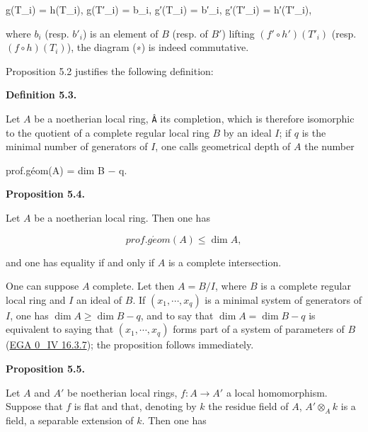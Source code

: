 \documentclass[
  11pt,
  a4paper,
]{book}
\newenvironment{Shaded}{}{}
\newcommand{\NormalTok}[1]{#1}
\begin{document}
\begin{Shaded}
\begin{Highlighting}[]
\NormalTok{g(T\_i) = h(T\_i),  g(T′\_i) = b\_i,  g′(T\_i) = b′\_i,  g′(T′\_i) = h′(T′\_i),}
\end{Highlighting}
\end{Shaded}

where \(b_{i}\) (resp. \(b'_{i}\)) is an element of \(B\) (resp. of
\(B'\)) lifting \((f' \circ h')(T'_{i})\) (resp. \((f \circ
h)(T_{i})\)), the diagram (∗) is indeed commutative.

Proposition 5.2 justifies the following definition:

\textbf{Definition 5.3.}

Let \(A\) be a noetherian local ring, \texttt{Â} its completion, which
is therefore isomorphic to the quotient of a complete regular local ring
\(B\) by an ideal \(I\); if \(q\) is the minimal number of generators of
\(I\), one calls geometrical depth of \(A\) the number

\begin{Shaded}
\begin{Highlighting}[]
\NormalTok{prof.géom(A) = dim B − q.}
\end{Highlighting}
\end{Shaded}

\textbf{Proposition 5.4.}

Let \(A\) be a noetherian local ring. Then one has

\[ prof.g\acute{e}om(A) \leqslant \dim A, \]

and one has equality if and only if \(A\) is a complete intersection.

One can suppose \(A\) complete. Let then \(A = B/I\), where \(B\) is a
complete regular local ring and \(I\) an ideal of \(B\). If
\((x_{1}, \cdots, x_{q})\) is a minimal system of generators of \(I\),
one has \(\dim A \geqslant \dim B - q\), and to say that
\(\dim A = \dim B - q\) is equivalent to saying that
\((x_{1}, \cdots, x_{q})\) forms part of a system of parameters of \(B\)
(\href{https://jcreinhold.github.io/ega/iv/03-ch0-16-dimension-and-depth.html\#163-systems-of-parameters-in-a-noetherian-local-ring}{EGA
0\_IV 16.3.7}); the proposition follows immediately.

\textbf{Proposition 5.5.}

Let \(A\) and \(A'\) be noetherian local rings, \(f : A \to A'\) a local
homomorphism. Suppose that \(f\) is flat and that, denoting by \(k\) the
residue field of \(A\), \(A' \otimes_{A} k\) is a field, a separable
extension of \(k\). Then one has
\end{document}

